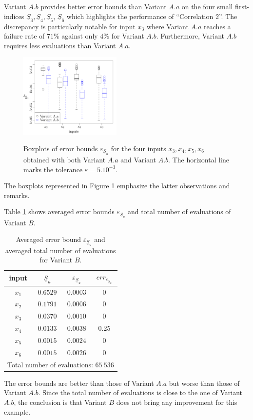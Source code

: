 Variant $A.b$ provides better error bounds than Variant $A.a$ on the four small first-indices $\underline{S}_3,\underline{S}_4,\underline{S}_5$, $\underline{S}_6$ which highlights the performance of ``Correlation 2''. The discrepancy is particularly notable for input $x_3$ where Variant $A.a$ reaches a failure rate of $71\%$ against only $4\%$ for Variant $A.b$. Furthermore, Variant $A.b$ requires less evaluations than Variant $A.a$.
\begin{figure}[!ht]
\caption{Boxplots of error bounds $\varepsilon_{\underline{S}_u}$ for the four inputs $x_3,x_4,x_5,x_6$ obtained with both Variant $A.a$ and Variant $A.b$. The horizontal line marks the tolerance $\varepsilon=5.10^{-3}$.}
\centering
\includegraphics[width=0.45\textwidth]{Images/boxplots_bis.pdf}
\label{boxplots.bratley}
\end{figure}
The boxplots represented in Figure \ref{boxplots.bratley} emphasize the latter observations and remarks.

Table \ref{res.bratley.B} shows averaged error bounds $\varepsilon_{\underline{S}_u}$ and total number of evaluations of Variant $B$. 
\begin{table}[!ht]
\caption{Averaged error bound $\varepsilon_{\underline{S}_u}$ and averaged total number of evaluations for Variant $B$.}
\centering
\begin{tabular}{cccc}
\hline
 input & $\underline{S}_u$ & $\varepsilon_{\underline{S}_u}$ & ${err}_{\varepsilon_{\underline{S}_u}}$ \\ \hline
 $x_1$ & $0.6529$ &  $0.0003$ & $0$ \\ \hline
 $x_2$ & $0.1791$ &  $0.0006$ & $0$ \\ \hline
 $x_3$ & $0.0370$ &  $0.0010$ & $0$ \\ \hline
 $x_4$ & $0.0133$ &  $0.0038$ & $0.25$    \\ \hline
 $x_5$ & $0.0015$ & $0.0024$ & $0$  \\ \hline
 $x_6$ & $0.0015$ & $0.0026$ & $0$  \\ \hline \hline
\multicolumn{4}{l}{Total number of evaluations: $65 \ 536$}\\ \hline 
\end{tabular}
\label{res.bratley.B}
\end{table}
The error bounds are better than those of Variant $A.a$ but worse than those of Variant $A.b$. Since the total number of evaluations is close to the one of Variant $A.b$, the conclusion is that Variant $B$ does not bring any improvement for this example.
\bigskip

